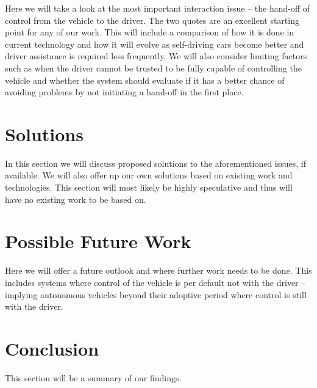 \documentclass{acm_proc_article-sp}
\begin{document}
Here we will take a look at the most important interaction issue – the hand-off of control from the vehicle to the driver.
The two quotes are an excellent starting point for any of our work.
This will include a comparison of how it is done in current technology and how it will evolve as self-driving cars become better and driver assistance is required less frequently.
We will also consider limiting factors such as when the driver cannot be trusted to be fully capable of controlling the vehicle and whether the system should evaluate if it has a better chance of avoiding problems by not initiating a hand-off in the first place.

\section{Solutions}

In this section we will discuss proposed solutions to the aforementioned issues, if available.
We will also offer up our own solutions based on existing work and technologies.
This section will most likely be highly speculative and thus will have no existing work to be based on.

\section{Possible Future Work}

Here we will offer a future outlook and where further work needs to be done.
This includes systems where control of the vehicle is per default not with the driver – implying autonomous vehicles beyond their adoptive period where control is still with the driver.

\section{Conclusion}

This section will be a summary of our findings.


  

\balancecolumns
\end{document}
